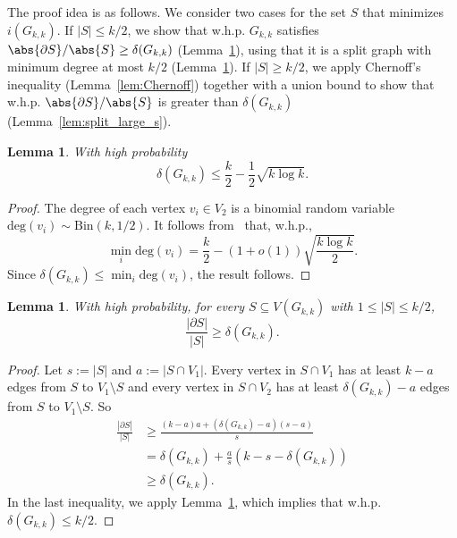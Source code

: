 \documentclass[a4paper,11pt]{article}
\newtheorem{lemma}[theorem]{Lemma}
\theoremstyle{definition}
\begin{document}
The proof idea is as follows. We consider two cases for the set $S$ that minimizes $i(G_{k, k})$. If $|S|\leq k/2$, we show that w.h.p. $G_{k,k}$ satisfies $\abs{\partial S}/\abs{S}\geq \delta(G_{k,k})$ (Lemma~\ref{lem:split_small_s}), using that it is a split graph with minimum degree at most $k/2$ (Lemma~\ref{lem:split_min_deg}). If $|S|\geq k/2$, we apply Chernoff's inequality (Lemma~\ref{lem:Chernoff}) together with a union bound to show that w.h.p. $\abs{\partial S}/\abs{S}$ is greater than $\delta(G_{k, k})$ (Lemma~\ref{lem:split_large_s}).


\begin{lemma}\label{lem:split_min_deg}
    With high probability
    \begin{equation*}
        \delta(G_{k, k}) \leq \frac{k}{2} - \frac{1}{2}\sqrt{k\log k}.
    \end{equation*}
\end{lemma}
\begin{proof}
    The degree of each vertex $v_i \in V_2$ is a binomial random variable $\text{deg}(v_i) \sim \text{Bin}(k,1/2)$. It follows from~\cite[Theorem 3.3]{Bollobas2001} that, w.h.p.,
    \begin{equation*}
        \min_{i} \text{deg}(v_i) = \frac{k}{2} - (1+o(1)) \sqrt{\frac{k\log k}{2}}.
    \end{equation*}
    Since $\delta(G_{k, k}) \leq \min_{i} \text{deg}(v_i)$, the result follows.
\end{proof}

\begin{lemma}\label{lem:split_small_s}
    With high probability, for every $S\subseteq V(G_{k,k})$ with $1 \leq |S| \leq k/2$,
    \begin{equation*}
        \frac{|\partial S|}{|S|} \geq \delta(G_{k,k}).
    \end{equation*}
\end{lemma}

\begin{proof}
    Let $s := |S|$ and $a := |S\cap V_1|$. Every vertex in $S\cap V_1$ has at least $k-a$ edges from $S$ to $V_1\setminus S$ and every vertex in $S\cap V_2$ has at least $\delta(G_{k,k})-a$ edges from $S$ to $V_1\setminus S$. So
    \begin{align*}
         \frac{|\partial S|}{|S|} &\geq \frac{(k-a)a + (\delta(G_{k,k}) - a)(s-a)}{s}\\
         &= \delta(G_{k,k}) + \frac{a}{s}(k - s - \delta(G_{k,k}))\\
         &\geq \delta(G_{k,k}).
    \end{align*}
    In the last inequality, we apply 
    Lemma~\ref{lem:split_min_deg}, which implies that w.h.p. $\delta(G_{k, k}) \leq k/2$.
\end{proof}
\end{document}

